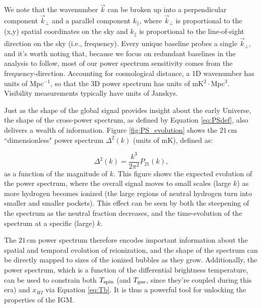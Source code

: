 We note that the wavenumber $\vec{k}$ can be broken up into a perpendicular component $\vec{k}_{\perp}$ and a parallel component $k_{\parallel}$, where $\vec{k}_{\perp}$ is proportional to the (x,y) spatial coordinates on the sky and $k_{\parallel}$ is proportional to the line-of-sight direction on the sky (i.e., frequency). Every unique baseline probes a single $\vec{k}_{\perp}$, and it's worth noting that, because we focus on redundant baselines in the analysis to follow, most of our power spectrum sensitivity comes from the frequency-direction. Accounting for cosmological distance, a 1D wavenumber has units of Mpc$^{-1}$, so that the 3D power spectrum has units of mK$^{2}\cdot$Mpc$^{3}$. Visibility measurements typically have units of Janskys.

Just as the shape of the global signal provides insight about the early Universe, the shape of the cross-power spectrum, as defined by Equation \eqref{eq:PSdef}, also delivers a wealth of information. Figure \ref{fig:PS_evolution} shows the $21$\,cm ``dimensionless" power spectrum $\Delta^{2}(k)$ (units of mK), defined as:

\begin{equation}
\Delta^{2}(k) = \frac{k^{3}}{2\pi^{2}}P_{21}(k),
\end{equation}
as a function of the magnitude of $k$. This figure shows the expected evolution of the power spectrum, where the overall signal moves to small scales (large $k$) as more hydrogen becomes ionized (the large regions of neutral hydrogen turn into smaller and smaller pockets). This effect can be seen by both the steepening of the spectrum as the neutral fraction decreases, and the time-evolution of the spectrum at a specific (large) $k$.

The $21$\,cm power spectrum therefore encodes important information about the spatial and temporal evolution of reionization, and the shape of the spectrum can be directly mapped to sizes of the ionized bubbles as they grow. Additionally, the power spectrum, which is a function of the differential brightness temperature, can be used to constrain both $T_{\rm spin}$ (and $T_{\rm gas}$, since they're coupled during this era) and $x_{HI}$ via Equation \eqref{eq:Tb}. It is thus a powerful tool for unlocking the properties of the IGM.


